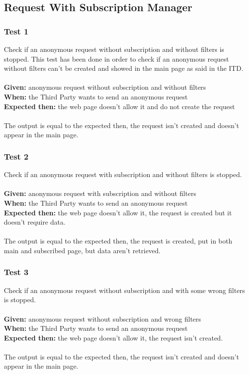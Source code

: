 \subsection{Request With Subscription Manager}

\subsubsection{\Large{Test 1}}
Check if an anonymous request without subscription and without filters is stopped. This test has been done in order to check if an anonymous request without filters can't be created and showed in the main page as  said in the ITD.\\
\\
\textbf{Given: } anonymous request without subscription and without filters\\
\textbf{When: } the Third Party wants to send an anonymous request\\
\textbf{Expected then: } the web page doesn't allow it and do not create the request\\
\\
The output is equal to the expected then, the request isn't created and doesn't appear in the main page.

\subsubsection{\Large{Test 2}}
Check if an anonymous request with subscription and without filters is stopped.\\
\\
\textbf{Given: } anonymous request with subscription and without filters\\
\textbf{When: } the Third Party wants to send an anonymous request\\
\textbf{Expected then: } the web page doesn't allow it, the request is created but it doesn't require data.\\
\\
The output is equal to the expected then, the request is created, put in both main and subscribed page, but data aren't retrieved.

\subsubsection{\Large{Test 3}}
Check if an anonymous request without subscription and with some wrong filters is stopped.\\
\\
\textbf{Given: } anonymous request without subscription and wrong filters\\
\textbf{When: } the Third Party wants to send an anonymous request\\
\textbf{Expected then: } the web page doesn't allow it, the request isn't created.\\
\\
The output is equal to the expected then, the request isn't created and doesn't appear in the main page.


